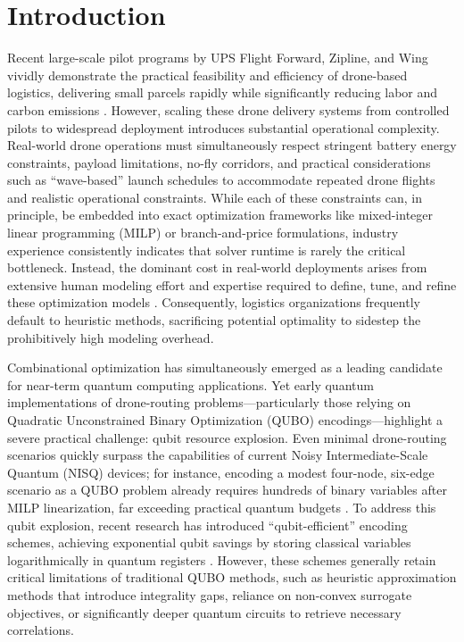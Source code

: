 
\section{Introduction}

Recent large-scale pilot programs by UPS Flight Forward, Zipline, and Wing vividly 
demonstrate the practical feasibility and efficiency of drone-based logistics, delivering 
small parcels rapidly while significantly reducing labor and carbon emissions 
\cite{murray2020survey}. However, scaling these drone delivery systems from controlled 
pilots to widespread deployment introduces substantial operational complexity. Real-world 
drone operations must simultaneously respect stringent battery energy constraints, payload 
limitations, no-fly corridors, and practical considerations such as ``wave-based'' launch 
schedules to accommodate repeated drone flights and realistic operational constraints. 
While each of these constraints can, in principle, be embedded into exact optimization 
frameworks like mixed-integer linear programming (MILP) or branch-and-price formulations, 
industry experience consistently indicates that solver runtime is rarely the critical 
bottleneck. Instead, the dominant cost in real-world deployments arises from extensive 
human modeling effort and expertise required to define, tune, and refine these optimization 
models \cite{kallrath_mixed_2000, rossi2006hcp}. Consequently, logistics organizations 
frequently default to heuristic methods, sacrificing potential optimality to sidestep the 
prohibitively high modeling overhead.

Combinational optimization has simultaneously emerged as a leading candidate for near-term 
quantum computing applications. Yet early quantum implementations of drone-routing 
problems---particularly those relying on Quadratic Unconstrained Binary Optimization 
(QUBO) encodings---highlight a severe practical challenge: qubit resource explosion. Even 
minimal drone-routing scenarios quickly surpass the capabilities of current Noisy 
Intermediate-Scale Quantum (NISQ) devices; for instance, encoding a modest four-node, 
six-edge scenario as a QUBO problem already requires hundreds of binary variables after 
MILP linearization, far exceeding practical quantum budgets \cite{davies_quantum_2024}. 
To address this qubit explosion, recent research has introduced ``qubit-efficient'' 
encoding schemes, achieving exponential qubit savings by storing classical variables 
logarithmically in quantum registers \cite{leonidas2024qubovrp, tan_qubit-efficient_2021, 
sundar_qubit-efficient_2024}. However, these schemes generally retain critical limitations 
of traditional QUBO methods, such as heuristic approximation methods that introduce 
integrality gaps, reliance on non-convex surrogate objectives, or significantly deeper 
quantum circuits to retrieve necessary correlations.

